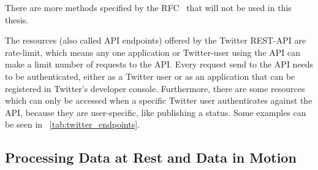 There are more methods specified by the RFC~\cite{RFC2616} that will not be used in this thesis.
\par
The resources (also called API endpoints) offered by the Twitter REST-API are rate-limit,
which means any one application or Twitter-user using the API can make a limit number of requests to the API.
Every request send to the API needs to be authenticated,
either as a Twitter user or as an application that can be registered in Twitter's developer console.
Furthermore, there are some resources which can only be accessed when a specific Twitter user authenticates
against the API, because they are user-specific, like publishing a status.
Some examples can be seen in ~\ref{tab:twitter_endpoints}.

\begin{table}
    \caption{A selection of resources offered by the Twitter REST API~\cite{twitterDocs}}
    \label{tab:twitter_endpoints}
\end{table}

\subsection{Processing Data at Rest and Data in Motion}
\label{subsec:dataAtRest-DataInMotion}

